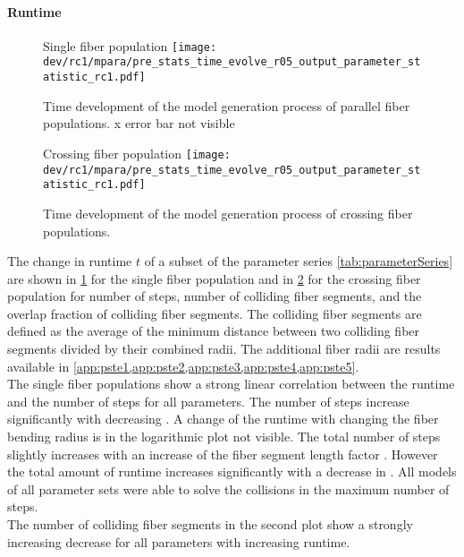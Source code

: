 \paragraph{Runtime}
% 
\begin{figure}[p]
\centering
Single fiber population \vspace{1em}
\texttt{[image: dev/rc1/mpara/pre\_stats\_time\_evolve\_r05\_output\_parameter\_statistic\_rc1.pdf]}
\caption[Time development parallel]{Time development of the model generation process of parallel fiber populations. x error bar not visible}
\label{fig:timeDevelopmentNone}
\end{figure}
% 
\begin{figure}[p]
\centering
Crossing fiber population \vspace{1em}
\texttt{[image: dev/rc1/mpara/pre\_stats\_time\_evolve\_r05\_output\_parameter\_statistic\_rc1.pdf]}
\caption[Time development parallel]{Time development of the model generation process of crossing fiber populations.}
\label{fig:timeDevelopmentCross}
\end{figure}
% 
The change in runtime $t$ of a subset of the parameter series \cref{tab:parameterSeries} are shown in \cref{fig:timeDevelopmentNone} for the single fiber population and in \cref{fig:timeDevelopmentCross} for the crossing fiber population for number of steps, number of colliding fiber segments, and the overlap fraction of colliding fiber segments.
The colliding fiber segments are defined as the average of the minimum distance between two colliding fiber segments divided by their combined radii.
The additional fiber radii are results available in \cref{app:pste1,app:pste2,app:pste3,app:pste4,app:pste5}.
\\
% 
The single fiber populations show a strong linear correlation between the runtime and the number of steps for all parameters.
The number of steps increase significantly with decreasing \segLengthFactor{}.
A change of the runtime with changing the fiber bending radius \segRadiusFactor{} is in the logarithmic plot not visible.
The total number of steps slightly  increases with an increase of the fiber segment length factor \segLengthFactor{}.
However the total amount of runtime increases significantly with a decrease in \segLengthFactor{}.
All models of all parameter sets were able to solve the collisions in the maximum number of steps.
\\
% 
The number of colliding fiber segments in the second plot show a strongly increasing decrease for all parameters with increasing runtime.
